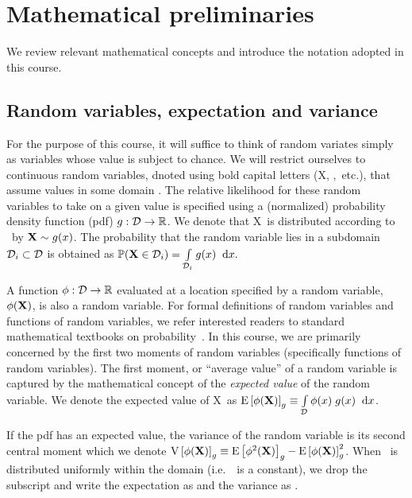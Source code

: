 \documentclass[11pt,fleqn]{book} %
\newcommand{\TBC} {\vspace {1em} \noindent [TO BE COMPLETED IN THE FINAL VERSION.] \vspace {1em}}
\begin{document}
\TBC 

\chapter{Mathematical preliminaries}
We review relevant mathematical concepts and introduce the notation adopted in this course.


\section{Random variables, expectation and variance}
For the purpose of this course, it will suffice to think of random variates simply as variables whose value is subject to chance. We will restrict ourselves to continuous random variables, dnoted using bold capital letters (\RV X, \yii,~etc.), that assume values in some domain \Dom. The relative likelihood for these random variables to take on a given value is specified using a (normalized) probability density function (pdf) $g: \mathcal{D} \rightarrow \mathbb{R}$. We denote that \RV X\ is distributed according to \sdn\ by $\mathbf{X} \sim g(x)$. The probability that the random variable lies in a subdomain $\mathcal{D}_{i} \subset \mathcal{D}$ is obtained as 
  $\mathbb{P}(\mathbf{X} \in \mathcal{D}_{i}) = \int\limits_{\mathcal{D}_{i}}^{} g(x) \;\; \mathrm{d}x.$

A function $\phi:\mathcal{D}\rightarrow\mathbb{R}$ evaluated at a location specified by a random variable, $\phi(\mathbf{X})$, is also a random variable. For formal definitions of random variables and functions of random variables, we refer interested readers to standard mathematical textbooks on probability~\cite{ProbTextBook}.
In this course, we are primarily concerned by the first two moments of random variables (specifically functions of random variables). The first moment, or ``average value'' of a random variable is captured by the mathematical concept of the \textit{expected value} of the random variable. We denote the expected value of \RV X\ as 
$ \mathrm{E} \left[\phi(\mathbf{X}) \right]_{g}   \equiv \int\limits_{\mathcal{D}}^{} \phi(x)\;g(x) \;\; \mathrm{d}x$. 

If the pdf has an expected value, the variance of the random variable is its second central moment which we denote
$\mathrm{V} \left[\phi(\mathbf{X})\right]_{g} \equiv \mathrm{E} \left[\phi^2(\mathbf{X}) \right]_{g} - \mathrm{E} \left[\phi(\mathbf{X}) \right]_{g}^2$. 
When \ is distributed uniformly within the domain (i.e.~\sdn\ is a constant), we drop the subscript and write the expectation as  and the variance as .
\end{document}
